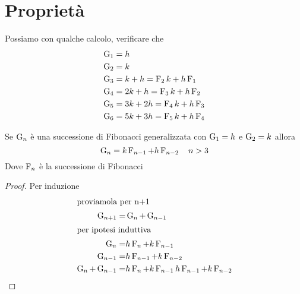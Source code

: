\section{Proprietà}
Possiamo con qualche calcolo, verificare che
\begin{align*}
\Gib{1}={}&h\\
\Gib{2}={}&k\\
\Gib{3}={}&k+h=\Fib{2}k+h\Fib{1}\\
\Gib{4}={}&2k+h=\Fib{3}k+h\Fib{2}\\
\Gib{5}={}&3k+2h=\Fib{4}k+h\Fib{3}\\
\Gib{6}={}&5k+3h=\Fib{5}k+h\Fib{4}
\end{align*} 
\begin{thm}[Derivazione]
	Se $\Gib{n}$ è una successione di Fibonacci generalizzata  con $\Gib{1}=h$ e $\Gib{2}=k $ allora
	\begin{equation}
		\Gib{n}=k\Fib{n-1}+h\Fib{n-2}\quad n>3
	\end{equation}\label{thm:FibGenDer}
	Dove $\Fib{n}$ è la successione di Fibonacci
\end{thm}
\begin{proof}
Per induzione
\begin{align*}
\intertext{proviamola per n+1}
		\Gib{n+1}=&\Gib{n}+\Gib{n-1}\\
\intertext{per ipotesi induttiva}
\Gib{n}=&h\Fib{n}+k\Fib{n-1}\\
\Gib{n-1}=&h\Fib{n-1}+k\Fib{n-2}\\
\Gib{n}+\Gib{n-1}=&h\Fib{n}+k\Fib{n-1}h\Fib{n-1}+k\Fib{n-2}\\
\end{align*}
\end{proof}